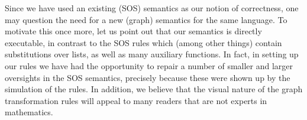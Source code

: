 Since we have used an existing (SOS) semantics as our notion of correctness,
one may question the need for a new (graph) semantics for the same language. To
motivate this once more, let us point out that our semantics is directly
executable, in contrast to the SOS rules which (among other things) contain
substitutions over lists, as well as many auxiliary functions. In fact, in
setting up our rules we have had the opportunity to repair a number of smaller
and larger oversights in the SOS semantics, precisely because these were shown
up by the simulation of the rules. In addition, we believe that the visual
nature of the graph transformation rules will appeal to many readers that are
not experts in mathematics.
